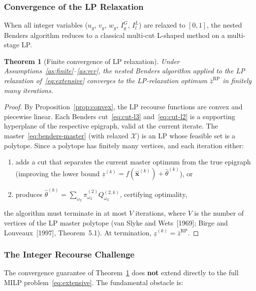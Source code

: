 \documentclass[11pt]{article}
\newtheorem{theorem}{Theorem}
\begin{document}
\subsubsection{Convergence of the LP Relaxation}

When all integer variables ($u_g$, $v_g$, $w_g$, $I^G_g$, $I^L_l$)
are relaxed to $[0,1]$, the nested Benders algorithm reduces to a
classical multi-cut L\nobreakdash-shaped method on a multi-stage LP.

\begin{theorem}[Finite convergence of LP relaxation]
\label{thm:benders-lp}
Under Assumptions~\ref{as:finite}--\ref{as:rcr}, the nested Benders
algorithm applied to the LP relaxation of~\eqref{eq:extensive} converges
to the LP-relaxation optimum $\bar{z}^{\mathrm{RP}}$ in finitely
many iterations.
\end{theorem}

\begin{proof}
By Proposition~\ref{prop:convex}, the LP recourse functions are
convex and piecewise linear. Each Benders cut~\eqref{eq:cut-l3}
and~\eqref{eq:cut-l2} is a supporting hyperplane of the respective
epigraph, valid at the current iterate. The master~\eqref{eq:benders-master}
(with relaxed $\mathcal{X}$) is an LP whose feasible set is a
polytope. Since a polytope has finitely many vertices, and each
iteration either:
\begin{enumerate}[nosep]
  \item adds a cut that separates the current master optimum from the
        true epigraph (improving the lower bound $\underline{z}^{(k)}
        = f(\hat{\mathbf{x}}^{(k)}) + \hat{\theta}^{(k)}$), or
  \item produces $\hat{\theta}^{(k)} = \sum_{\omega_2}
        \pi^{(2)}_{\omega_2} Q^{(2,k)}_{\omega_2}$, certifying
        optimality,
\end{enumerate}
the algorithm must terminate in at most $V$ iterations, where $V$ is
the number of vertices of the LP master polytope (van Slyke and
Wets~[1969]; Birge and Louveaux~[1997], Theorem~5.1). At termination,
$\underline{z}^{(k)} = \bar{z}^{\mathrm{RP}}$.
\end{proof}

\subsubsection{The Integer Recourse Challenge}
\label{sec:integer-challenge}

The convergence guarantee of Theorem~\ref{thm:benders-lp} does
\textbf{not} extend directly to the full MILP problem~\eqref{eq:extensive}.
The fundamental obstacle is:
\end{document}
